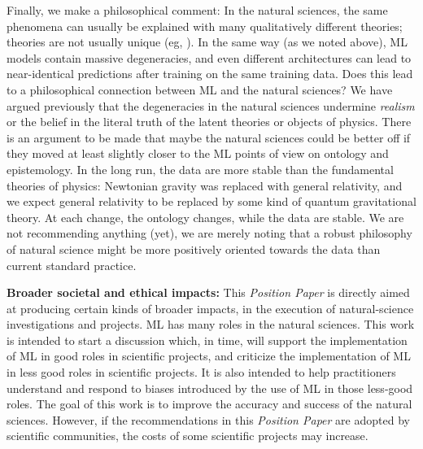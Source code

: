 \documentclass{article}
\newcommand{\documentname}{\textsl{Position Paper}}
\renewcommand{\paragraph}[1]{\noindent\par\textbf{#1}}
\begin{document}
Finally, we make a philosophical comment:
In the natural sciences, the same phenomena can usually be explained with many qualitatively different theories; theories are not usually unique (eg, \citealt{hogg, peebles}).
In the same way (as we noted above), ML models contain massive degeneracies, and even different architectures can lead to near-identical predictions after training on the same training data.
Does this lead to a philosophical connection between ML and the natural sciences?
We have argued previously \cite{hogg} that the degeneracies in the natural sciences undermine \emph{realism} or the belief in the literal truth of the latent theories or objects of physics.
There is an argument to be made that maybe the natural sciences could be better off if they moved at least slightly closer to the ML points of view on ontology and epistemology.
In the long run, the data are more stable than the fundamental theories of physics:
Newtonian gravity was replaced with general relativity, and we expect general relativity to be replaced by some kind of quantum gravitational theory.
At each change, the ontology changes, while the data are stable.
We are not recommending anything (yet), we are merely noting that a robust philosophy of natural science might be more positively oriented towards the data than current standard practice.

\paragraph{Broader societal and ethical impacts:}
This \documentname{} is directly aimed at producing certain kinds of broader impacts, in the execution of natural-science investigations and projects.
ML has many roles in the natural sciences.
This work is intended to start a discussion which, in time, will support the implementation of ML in good roles in scientific projects, and criticize the implementation of ML in less good roles in scientific projects.
It is also intended to help practitioners understand and respond to biases introduced by the use of ML in those less-good roles.
The goal of this work is to improve the accuracy and success of the natural sciences.
However, if the recommendations in this \documentname{} are adopted by scientific communities, the costs of some scientific projects may increase.
\end{document}
